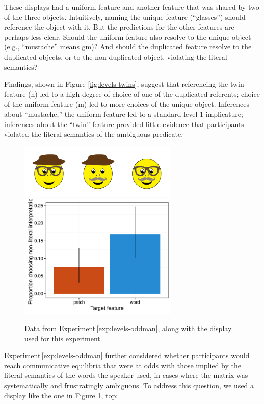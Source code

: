 \documentclass[man,noapacite]{apa2}
\newcounter{Experiment}
\newcommand{\exptref}[1]{Experiment\,\ref{#1}}
\begin{document}
\noindent These displays had a uniform feature and another feature that was shared by two of the three objects. Intuitively, naming the unique feature (``glasses'') should reference the object with it. But the predictions for the other features are perhaps less clear. Should the uniform feature also resolve to the unique object (e.g., ``mustache'' means {\sc gm})? And should the duplicated feature resolve to the duplicated objects, or to the non-duplicated object, violating the literal semantics?

Findings, shown in Figure \ref{fig:levels-twins}, suggest that referencing the twin feature ({\sc h}) led to a high degree of choice of one of the duplicated referents; choice of the uniform feature ({\sc m}) led to more choices of the unique object. Inferences about ``mustache,'' the uniform feature led to a standard level 1 implicature; inferences about the ``twin'' feature provided little evidence that participants violated the literal semantics of the ambiguous predicate.

 \begin{figure}[t]
  \centering
  \includegraphics[width=3in]{figures/levels-oddman-stim.pdf}
  \includegraphics[width=3in]{../plots/3-levels-oddman.pdf}

  \caption{\label{fig:levels-oddman} Data from \exptref{exp:levels-oddman}, along with the display used for this experiment.}
\end{figure}

\exptref{exp:levels-oddman} further considered whether participants would reach communicative equilibria that were at odds with those implied by the literal semantics of the words the speaker used, in cases where the matrix was systematically and frustratingly ambiguous. To address this question, we used a display like the one in Figure \ref{fig:levels-oddman}, top:
\end{document}
